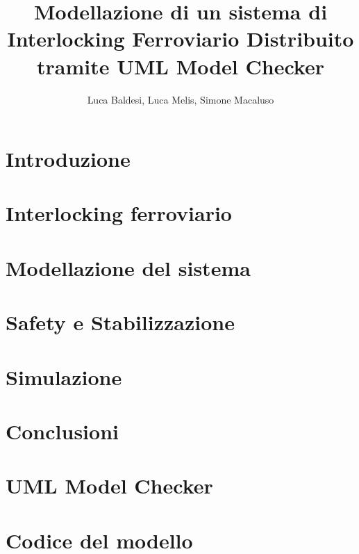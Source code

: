 \documentclass[10pt,a4paper,oneside]{report}
\author{Luca Baldesi, Luca Melis, Simone Macaluso}
\title{Modellazione di un sistema di
Interlocking Ferroviario Distribuito
tramite UML Model Checker
}
\begin{document}
\maketitle

\chapter*{Introduzione}
\chapter{Interlocking ferroviario}

\chapter{Modellazione del sistema}

\chapter{Safety e Stabilizzazione}

\chapter{Simulazione}

\chapter{Conclusioni}
\appendix
\chapter{UML Model Checker}
\chapter{Codice del modello}
\end{document}
